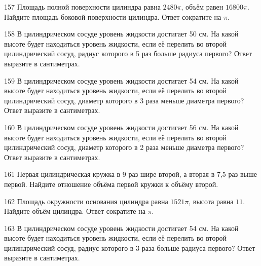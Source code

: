 \documentclass[4apaper]{article}
\begin{document}
\begin{taskBN}{157}
Площадь полной поверхности цилиндра равна $2480\pi$, объём равен $16800\pi$. Найдите площадь боковой поверхности цилиндра. Ответ сократите на $\pi$.
\end{taskBN}

\begin{taskBN}{158}
В цилиндрическом сосуде уровень жидкости достигает 50 см. На какой высоте будет находиться уровень жидкости, если её перелить во второй цилиндрический сосуд, радиус которого в 5 раз больше радиуса первого? Ответ выразите в сантиметрах.
\end{taskBN}

\begin{taskBN}{159}
В цилиндрическом сосуде уровень жидкости достигает 54 см. На какой высоте будет находиться уровень жидкости, если её перелить во второй цилиндрический сосуд, диаметр которого в 3 раза меньше диаметра первого? Ответ выразите в сантиметрах.
\end{taskBN}

\begin{taskBN}{160}
В цилиндрическом сосуде уровень жидкости достигает 56 см. На какой высоте будет находиться уровень жидкости, если её перелить во второй цилиндрический сосуд, диаметр которого в 2 раза меньше диаметра первого? Ответ выразите в сантиметрах.
\end{taskBN}

\begin{taskBN}{161}
 Первая цилиндрическая кружка в 9 раз шире второй, а вторая в 7,5 раз выше первой. Найдите отношение объёма первой кружки к объёму второй.
\end{taskBN}

\begin{taskBN}{162}
Площадь окружности основания цилиндра равна $1521\pi$, высота равна $11$. Найдите объём цилиндра. Ответ сократите на $\pi$.
\end{taskBN}

\begin{taskBN}{163}
В цилиндрическом сосуде уровень жидкости достигает 54 см. На какой высоте будет находиться уровень жидкости, если её перелить во второй цилиндрический сосуд, радиус которого в 3 раза больше радиуса первого? Ответ выразите в сантиметрах.
\end{taskBN}
\end{document}
